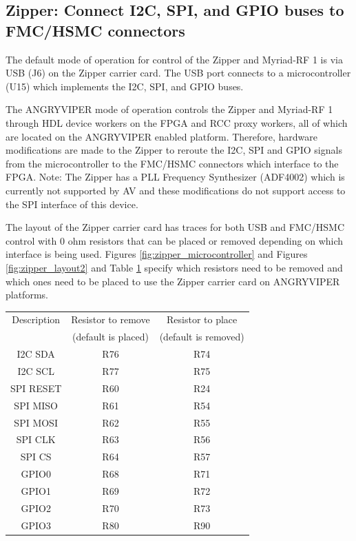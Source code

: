 \documentclass{article}
\begin{document}
\subsection*{Zipper: Connect I2C, SPI, and GPIO buses to FMC/HSMC connectors}
\small
The default mode of operation for control of the Zipper and Myriad-RF 1 is via USB (J6) on the Zipper carrier card. The USB port connects to a microcontroller (U15)  which implements the I2C, SPI, and GPIO buses.\par\medskip
\noindent The ANGRYVIPER mode of operation controls the Zipper and Myriad-RF 1 through HDL device workers on the FPGA and RCC proxy workers, all of which are located on the ANGRYVIPER enabled platform. Therefore, hardware modifications are made to the Zipper to reroute the I2C, SPI and GPIO signals from the microcontroller to the FMC/HSMC connectors which interface to the FPGA. Note: The Zipper has a PLL Frequency Synthesizer (ADF4002) which is currently not supported by AV and these modifications do not support access to the SPI interface of this device.\par\medskip
\noindent The layout of the Zipper carrier card has traces for both USB and FMC/HSMC control with 0 ohm resistors that can be placed or removed depending on which interface is being used. Figures \ref{fig:zipper_microcontroller} and Figures \ref{fig:zipper_layout2} and Table \ref{table:resistors_to_replace} specify which resistors need to be removed and which ones need to be placed to use the Zipper carrier card on ANGRYVIPER platforms.\par\bigskip
	\scriptsize
	\begin{table}[h]
	\begin{center}
	\scriptsize
	\begin{tabular}{|c|c|c|}
		\hline
    	\rowcolor{blue}
    	Description & Resistor to remove & Resistor to place\\
    	\rowcolor{blue}
    	~ & (default is placed) & (default is removed) \\
    	\hline
    	I2C SDA & R76 & R74 \\
    	\hline
    	I2C SCL & R77 & R75 \\
    	\hline
    	SPI RESET & R60 & R24 \\
    	\hline
    	SPI MISO & R61 & R54 \\
    	\hline
    	SPI MOSI & R62 & R55 \\
    	\hline
    	SPI CLK & R63 & R56 \\
    	\hline
    	SPI CS & R64 & R57 \\
    	\hline
    	GPIO0 & R68 & R71 \\
    	\hline
    	GPIO1 & R69 & R72 \\
    	\hline
    	GPIO2 & R70 & R73 \\
    	\hline
    	GPIO3 & R80 & R90 \\
    	\hline
    \end{tabular}
   	\label{table:resistors_to_replace}
	\end{center}
   	\end{table}
\end{document}
